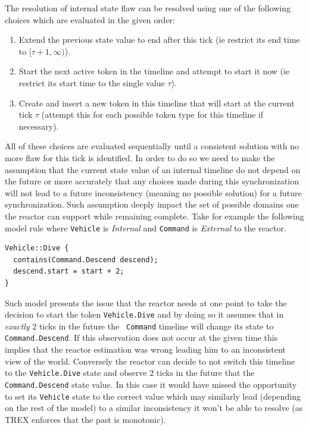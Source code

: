The resolution of internal state flaw can be resolved using one of the
following choices which are evaluated in the given order:

\begin{enumerate}

\item Extend the previous state value to end after this tick (ie
  restrict its end time to $[\tau+1, \infty)$). 

\item Start the next active token in the timeline and
  attempt to start it now (ie restrict its start time to the single
  value $\tau$).

\item Create and insert a new token in this timeline that will start
  at the current tick $\tau$ (attempt this for each possible token
  type for this timeline if necessary). 

\end{enumerate}

All of these choices are evaluated sequentially until a consistent
solution with no more flaw for this tick is identified. In order to do
so we need to make the assumption that the current state value of an
internal timeline do not depend on the future or more accurately that
any choices made during this synchronization will not lead to a future
inconsistency (meaning no possible solution) for a future
synchronization. Such assumption deeply impact the set of possible
domains one the reactor can support while remaining complete. Take for
example the following model rule where {\tt Vehicle} is {\em Internal}
and {\tt Command} is {\em External} to the reactor.

\begin{verbatim}
Vehicle::Dive {
  contains(Command.Descend descend);
  descend.start = start + 2;
}
\end{verbatim}

Such model presents the issue that the reactor needs at one point to
take the decision to start the token {\tt Vehicle.Dive} and by doing
so it assumes that in {\em exactly} 2 ticks in the future the {\tt
  Command} timeline will change its state to {\tt Command.Descend}. If
this observation does not occur at the given time this implies that
the reactor estimation was wrong leading him to an inconsistent view
of the world. Conversely the reactor can decide to not switch this
timeline to the {\tt Vehicle.Dive} state and observe 2 ticks in the
future that the {\tt Command.Descend} state value. In this case it
would have missed the opportunity to set its {\tt Vehicle} state to
the correct value which may similarly lead (depending on the rest of
the model) to a similar inconsistency it won't be able to resolve (as
TREX enforces that the past is monotonic).


